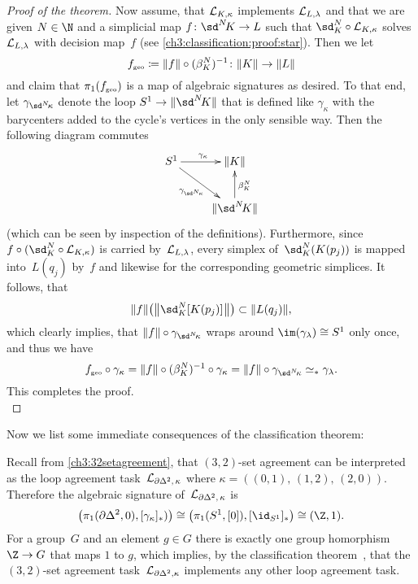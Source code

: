 \begin{proof}[Proof of the theorem]
    Now assume, that $\mathcal{L}_{K,\kappa}$ implements $\mathcal{L}_{L,\lambda}$ and that we
    are given $N\in\N$ and a simplicial map $f\colon\sdNK\to L$ such that
    $\sd_K^N\after\Loop{K,\kappa}$ solves $\mathcal{L}_{L,\lambda}$ with decision
    map~$f$ (see \eqref{ch3:classification:proof:star}). Then we let
    \[ f_\geo \defeq \geom{f} \after (\beta_K^N)^{-1}
        \colon\geom K\to\geom L
    \]
    and claim that $\pi_1(f_{\scriptscriptstyle\mathrm{geo}})$ is a map of algebraic signatures as desired.
    To that end, let $\gamma_{\sdNkappa}$ denote the loop
    $S^1\to\geom{\sdNK}$ that is defined like $\gamma_\kappa$
     with the barycenters added to the cycle's
    vertices in the only sensible way. Then the following diagram commutes
    \[
        \xymatrix{
            S^1 \ar[r]^{\gamma_\kappa} \ar[dr]_{\gamma_{\sdNkappa}}
            & \geom{K}
            \\
            & \geom{\sdNK} \ar[u]_{\beta_K^N}
        }
    \]
    (which can be seen by inspection of the definitions).
    Furthermore, since $f\after(\sd_K^N\after\Loop{K,\kappa})$ is
    carried by~$\mathcal{L}_{L,\lambda}$, every simplex of~$\sd_K^N(K(p_j))$
    is mapped into~$L(q_j)$ by~$f$ and likewise for the corresponding
    geometric simplices. It follows, that
    \[ \geom{f}\bigl(\geom[\big]{\sd_K^N[K(p_j)]\mkern1mu}\bigr)
        \subset \geom{L(q_j)}
    , \]
    which clearly implies, that $\geom{f}\after\gamma_{\sdNkappa}$
    wraps around $\im(\gamma_\lambda)\cong S^1$ only once,
    and thus we have
    \[ f_\geo\after\gamma_\kappa 
        = \geom{f}\after(\beta_K^N)^{-1} \after\gamma_\kappa
        = \geom{f}\after\gamma_{\sdNkappa}
        \simeq_\ast \gamma_\lambda
    . \]
    This completes the proof.
    \\
\end{proof}

\pagebreak[2]
Now we list some immediate consequences of the classification theorem:

\begin{thCorollary}
    \label{ch3:32setagreementisboss}
    Recall from \cref{ch3:32setagreement}, that $(3,2)$-set agreement can be
    interpreted as the loop agreement task~$\mathcal{L}_{\partial\Delta^2,\,\kappa}$
    where $\kappa = ((0,1),\,(1,2),\,(2,0))$. Therefore the algebraic signature
    of~$\mathcal{L}_{\partial\Delta^2,\,\kappa}$ is
    \[ \bigl( \pi_1(\partial\Delta^2,0), [\gamma_\kappa]_\ast) \bigr)
        \cong \bigl( \pi_1(S^1,[0]), [\id_{S^1}]_\ast \bigr)
        \cong (\Z,1)
    . \]
    For a group~$G$ and an element $g\in G$ there is exactly one group
    homorphism $\Z\to G$ that maps $1$ to $g$, which implies, by the
    classification theorem~, that the $(3,2)$-set
    agreement task~$\mathcal{L}_{\partial\Delta^2,\kappa}$ implements any other
    loop agreement task.
\end{thCorollary}

